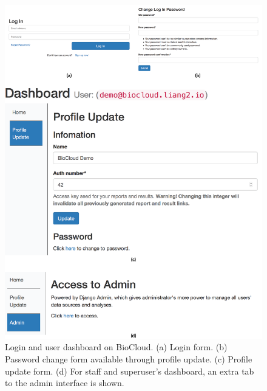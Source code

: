 \begin{figure}[!p]
\centering
\includegraphics[width=1\textwidth]{images/biocloud_dashboard}
\caption[Login and user dashboard on BioCloud]{
    Login and user dashboard on BioCloud.
    (a) Login form.
    (b) Password change form available through profile update.
    (c) Profile update form.
    (d) For staff and superuser's dashboard, an extra tab to the admin
    interface is shown.
}
\label{fig:biocloud-dashboard}
\end{figure}

